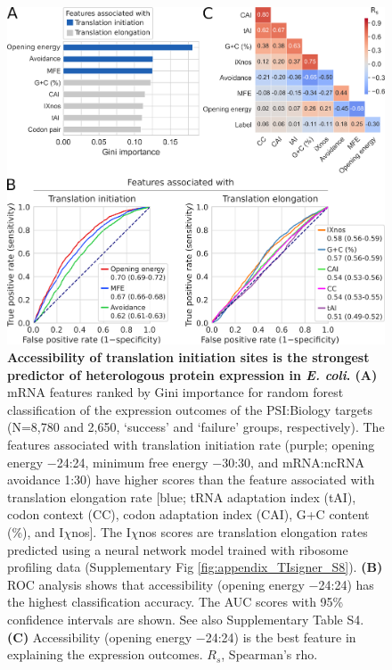 \begin{figure}[hbtp!]
	\center
	\includegraphics[width=1\textwidth]{chapters/TIsigner/Figs/fig3.png}
	\caption[Accessibility of translation initiation sites is the strongest predictor of heterologous protein expression in \textit{E. coli}.]{\textbf{Accessibility of translation initiation sites is the strongest predictor of heterologous protein expression in \textit{E. coli}. (A)} mRNA features ranked by Gini importance for random forest classification of the expression outcomes of the PSI:Biology targets (N=8,780 and 2,650, ‘success’ and ‘failure’ groups, respectively). The features associated with translation initiation rate (purple; opening energy −24:24, minimum free energy −30:30, and mRNA:ncRNA avoidance 1:30) have higher scores than the feature associated with translation elongation rate [blue; tRNA adaptation index (tAI), codon context (CC), codon adaptation index (CAI), G+C content (\%), and I$\chi$nos]. The I$\chi$nos scores are translation elongation rates predicted using a neural network model trained with ribosome profiling data (Supplementary Fig \ref{fig:appendix_TIsigner_S8}). \textbf{(B)} ROC analysis shows that accessibility (opening energy −24:24) has the highest classification accuracy. The AUC scores with 95\% confidence intervals are shown. See also Supplementary Table S4. \textbf{(C)} Accessibility (opening energy −24:24) is the best feature in explaining the expression outcomes.  $R_s$, Spearman’s rho. }
	\label{fig:tisigner_fig3}
\end{figure}




